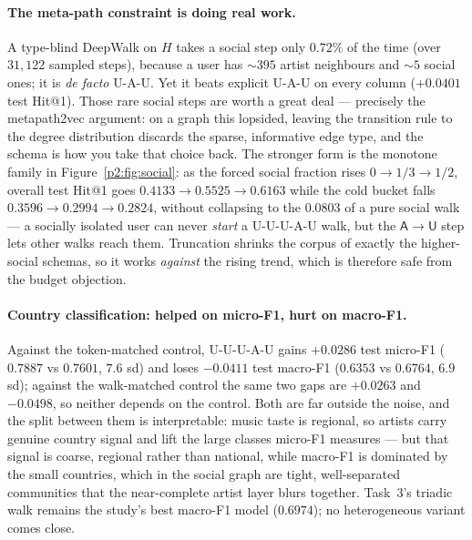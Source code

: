 \paragraph{The meta-path constraint is doing real work.}
A type-blind DeepWalk on $H$ takes a social step only $0.72\%$ of the time (over $31{,}122$
sampled steps), because a user has $\sim\!395$ artist neighbours and $\sim\!5$ social ones;
it is \emph{de facto} \textsf{U-A-U}.  Yet it beats explicit \textsf{U-A-U} on every column
($+0.0401$ test Hit@1).  Those rare social steps are worth a great deal --- precisely the
metapath2vec argument: on a graph this lopsided, leaving the transition rule to the degree
distribution discards the sparse, informative edge type, and the schema is how you take that
choice back.  The stronger form is the monotone family in Figure~\ref{p2:fig:social}: as the
forced social fraction rises $0 \to 1/3 \to 1/2$, overall test Hit@1 goes
$0.4133 \to 0.5525 \to 0.6163$ while the cold bucket falls $0.3596 \to 0.2994 \to 0.2824$,
without collapsing to the $0.0803$ of a pure social walk --- a socially isolated user can
never \emph{start} a \textsf{U-U-U-A-U} walk, but the $\mathsf{A}\to\mathsf{U}$ step lets
other walks reach them.  Truncation shrinks the corpus of exactly the higher-social schemas,
so it works \emph{against} the rising trend, which is therefore safe from the budget
objection.

\paragraph{Country classification: helped on micro-F1, hurt on macro-F1.}
Against the token-matched control, \textsf{U-U-U-A-U} gains $+0.0286$ test micro-F1
($0.7887$ vs $0.7601$, $7.6$ sd) and loses $-0.0411$ test macro-F1 ($0.6353$ vs $0.6764$,
$6.9$ sd); against the walk-matched control the same two gaps are $+0.0263$ and $-0.0498$,
so neither depends on the control.  Both are far outside the noise, and the split between
them is interpretable:
music taste is regional, so artists carry genuine country signal and lift the large classes
micro-F1 measures --- but that signal is coarse, regional rather than national, while
macro-F1 is dominated by the small countries, which in the social graph are tight,
well-separated communities that the near-complete artist layer blurs together.  Task~3's
triadic walk remains the study's best macro-F1 model ($0.6974$); no heterogeneous variant
comes close.


